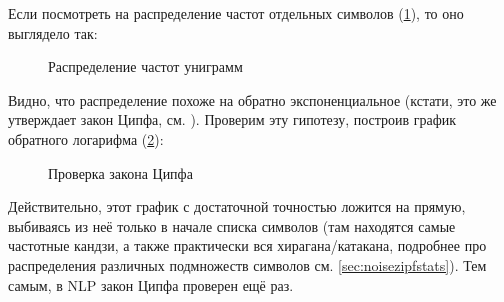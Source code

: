 \vspace{20pt}

Если посмотреть на распределение частот отдельных символов (\cref{plt:gramstats1_all}), то оно выглядело так:

\begin{figure}[H]
\caption{Распределение частот униграмм}
\label{plt:gramstats1_all}
\end{figure}


Видно, что распределение похоже на обратно экспоненциальное (кстати, это же утверждает закон Ципфа, см. \cite{manning}). Проверим эту гипотезу, построив график обратного логарифма (\cref{plt:gramstats1log}):

\loadedtable

\begin{figure}[H]
	\caption{Проверка закона Ципфа}
	\label{plt:gramstats1log}
\end{figure}

Действительно, этот график с достаточной точностью ложится на прямую, выбиваясь из неё только в начале списка символов (там находятся самые частотные кандзи, а также практически вся хирагана/катакана, подробнее про распределения различных подмножеств символов см. \cref{sec:noisezipfstats}). Тем самым, в NLP закон Ципфа проверен ещё раз.

